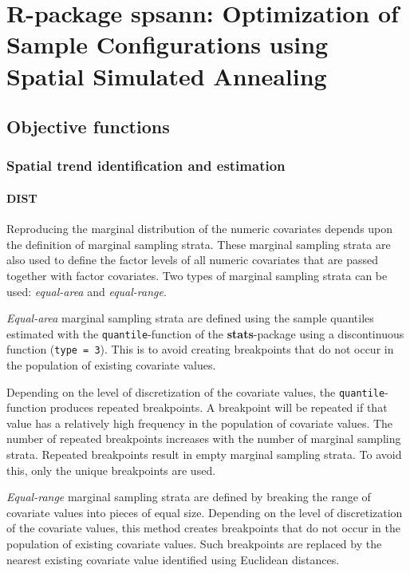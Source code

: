 \artigofalse
\chapter{R-package spsann: Optimization of Sample Configurations using Spatial Simulated Annealing}
\label{apen:spsann}

% 

\section{Objective functions}

\subsection{Spatial trend identification and estimation}

\subsubsection{DIST}

Reproducing the marginal distribution of the numeric covariates depends upon
the definition of marginal sampling strata. These marginal sampling strata 
are also used to define the factor levels of all numeric covariates that  
are passed together with factor covariates. Two types of marginal sampling 
strata can be used: \textit{equal-area} and \textit{equal-range}.

\textit{Equal-area} marginal sampling strata are defined using the sample 
quantiles estimated with the \texttt{quantile}-function of the 
\textbf{stats}-package using a discontinuous function (\texttt{type = 3}). This 
is to avoid creating breakpoints that do not occur in the population of 
existing covariate values.

Depending on the level of discretization of the covariate values, 
the \texttt{quantile}-function produces repeated breakpoints. A breakpoint 
will be repeated if that value has a relatively high frequency in the 
population of covariate values. The number of repeated breakpoints increases 
with the number of marginal sampling strata. Repeated breakpoints result in
empty marginal sampling strata. To avoid this, only the unique breakpoints 
are used.

\textit{Equal-range} marginal sampling strata are defined by breaking the range
of covariate values into pieces of equal size. Depending on the level of 
discretization of the covariate values, this method creates breakpoints that
do not occur in the population of existing covariate values. Such breakpoints
are replaced by the nearest existing covariate value identified using 
Euclidean distances.

